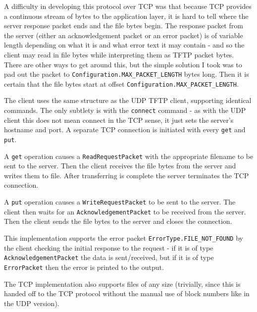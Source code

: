\documentclass[a4paper]{article}
\newcommand{\code}{\texttt}
\begin{document}
A difficulty in developing this protocol over TCP was that because TCP provides a continuous stream of bytes to the application layer, it is hard to tell where the server response packet ends and the file bytes begin. The response packet from the server (either an acknowledgement packet or an error packet) is of variable length depending on what it is and what error text it may contain - and so the client may read in file bytes while interpreting them as TFTP packet bytes. There are other ways to get around this, but the simple solution I took was to pad out the packet to \code{Configuration.MAX\_PACKET\_LENGTH} bytes long. Then it is certain that the file bytes start at offset \code{Configuration.MAX\_PACKET\_LENGTH}.

The client uses the same structure as the UDP TFTP client, supporting identical commands. The only subtlety is with the \code{connect} command - as with the UDP client this does not mean connect in the TCP sense, it just sets the server's hostname and port. A separate TCP connection is initiated with every \code{get} and \code{put}.

A \code{get} operation causes a \code{ReadRequestPacket} with the appropriate filename to be sent to the server. Then the client receives the file bytes from the server and writes them to file. After transferring is complete the server terminates the TCP connection.

A \code{put} operation causes a \code{WriteRequestPacket} to be sent to the server. The client then waits for an \code{AcknowledgementPacket} to be received from the server. Then the client sends the file bytes to the server and closes the connection. 

This implementation supports the error packet \code{ErrorType.FILE\_NOT\_FOUND} by the client checking the initial response to the request - if it is of type \code{AcknowledgementPacket} the data is sent/received, but if it is of type \code{ErrorPacket} then the error is printed to the output.

The TCP implementation also supports files of any size (trivially, since this is handed off to the TCP protocol without the manual use of block numbers like in the UDP version).
\end{document}
